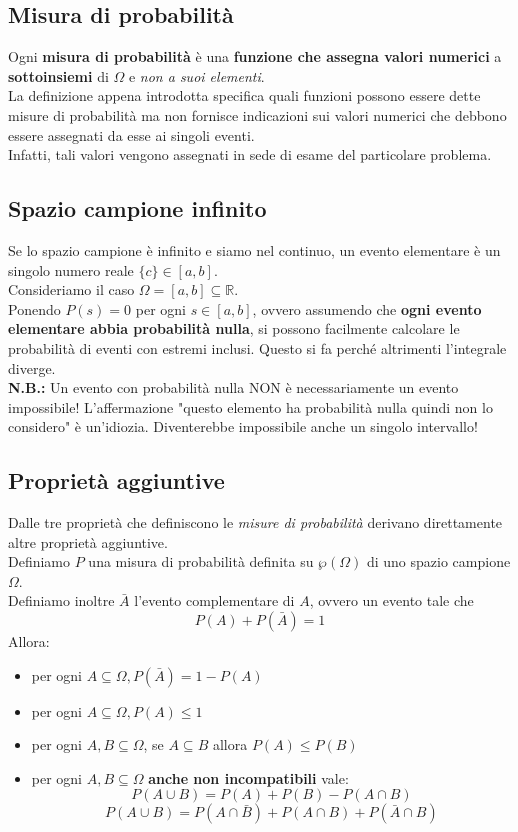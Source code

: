 \subsection{Misura di probabilità}
Ogni \textbf{misura di probabilità} è una \textbf{funzione che assegna valori numerici} a \textbf{sottoinsiemi} di $\Omega$ e \textit{non a suoi elementi}.\\
La definizione appena introdotta specifica quali funzioni possono essere dette misure di probabilità ma non fornisce indicazioni sui valori numerici che debbono essere assegnati da esse ai singoli eventi. \\
Infatti, tali valori vengono assegnati in sede di esame del particolare problema.

\subsection{Spazio campione infinito}
Se lo spazio campione è infinito e siamo nel continuo, un evento elementare è un singolo numero reale $\{c\} \in [a,b]$. \\
Consideriamo il caso $\Omega = [a, b] \subseteq \mathbb{R}$. \\
Ponendo $P({s}) = 0$ per ogni $s \in [a, b]$, ovvero assumendo che \textbf{ogni evento elementare abbia probabilità nulla}, si possono facilmente calcolare le probabilità di eventi con estremi inclusi. Questo si fa perché altrimenti l'integrale diverge. \\
\textbf{N.B.:} Un evento con probabilità nulla NON è necessariamente un evento impossibile! L'affermazione "questo elemento ha probabilità nulla quindi non lo considero" è un'idiozia. Diventerebbe impossibile anche un singolo intervallo! \\

\subsection{Proprietà aggiuntive}
Dalle tre proprietà che definiscono le \textit{misure di probabilità} derivano direttamente altre proprietà aggiuntive. \\
Definiamo $P$ una misura di probabilità definita su $\wp (\Omega)$ di uno spazio campione $\Omega$.\\
Definiamo inoltre $\bar{A}$ l'evento complementare di $A$, ovvero un evento tale che 
\[ P(A) + P(\bar{A}) = 1\]
Allora:
\begin{itemize}
	 \item per ogni $A \subseteq \Omega, P(\bar{A}) = 1 - P(A)$
	 \item per ogni $A \subseteq \Omega, P(A) \leq 1$
	 \item per ogni $A, B \subseteq \Omega$, se $A \subseteq B$ allora $P(A) \leq P(B)$
	 \item per ogni $A, B \subseteq \Omega$ \textbf{anche non incompatibili} vale:
	 	\[ 	P(A \cup B) = P(A) + P(B) - P(A \cap B) \] 
	 	\[	P(A \cup B) = P(A \cap \bar{B}) + P(A \cap B) + P(\bar{A} \cap B)
	 	\]
\end{itemize}
 
